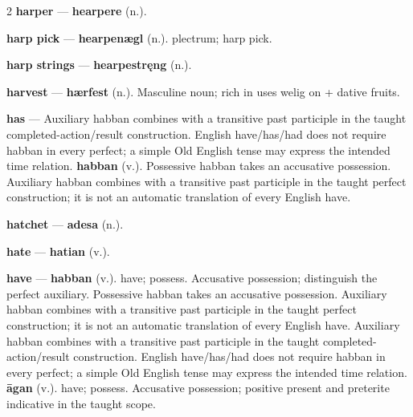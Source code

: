 \begin{multicols}{2}
\textbf{harper} — \textbf{hearpere} (n.).\par
\textbf{harp pick} — \textbf{hearpenægl} (n.). plectrum; harp pick.\par
\textbf{harp strings} — \textbf{hearpestręng} (n.).\par
\textbf{harvest} — \textbf{hærfest} (n.). Masculine noun; rich in uses welig on + dative fruits.\par
\textbf{has} — Auxiliary habban combines with a transitive past participle in the taught completed-action/result construction. English have/has/had does not require habban in every perfect; a simple Old English tense may express the intended time relation. \textbf{habban} (v.). Possessive habban takes an accusative possession. Auxiliary habban combines with a transitive past participle in the taught perfect construction; it is not an automatic translation of every English have.\par
\textbf{hatchet} — \textbf{adesa} (n.).\par
\textbf{hate} — \textbf{hatian} (v.).\par
\textbf{have} — \textbf{habban} (v.). have; possess. Accusative possession; distinguish the perfect auxiliary. Possessive habban takes an accusative possession. Auxiliary habban combines with a transitive past participle in the taught perfect construction; it is not an automatic translation of every English have. Auxiliary habban combines with a transitive past participle in the taught completed-action/result construction. English have/has/had does not require habban in every perfect; a simple Old English tense may express the intended time relation. \textbf{āgan} (v.). have; possess. Accusative possession; positive present and preterite indicative in the taught scope.\par

\end{multicols}
